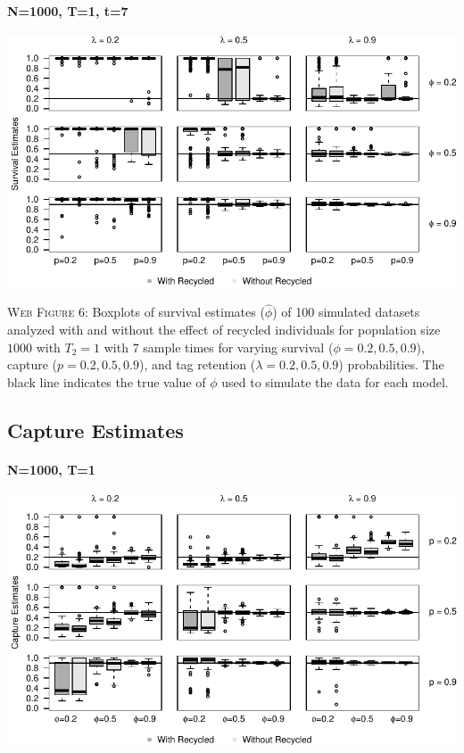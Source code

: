 \documentclass[]{article}
\let\oldparagraph\paragraph
\renewcommand{\paragraph}[1]{\oldparagraph{#1}\mbox{}}
\begin{document}
\paragraph{N=1000, T=1, t=7}\label{n1000-t1-t7}

\includegraphics{Appendix_BW_files/figure-latex/figure6_survival_GJSTL6-1.pdf}

\textsc{Web Figure 6:} Boxplots of survival estimates (\(\hat{\phi}\))
of 100 simulated datasets analyzed with and without the effect of
recycled individuals for population size \(1000\) with \(T_2=1\) with 7
sample times for varying survival (\(\phi=0.2,0.5,0.9\)), capture
(\(p=0.2,0.5,0.9\)), and tag retention (\(\lambda=0.2,0.5,0.9\))
probabilities. The black line indicates the true value of \(\phi\) used
to simulate the data for each model.

\newpage

\subsection{Capture Estimates}\label{capture-estimates}

\paragraph{N=1000, T=1}\label{n1000-t1-1}

\includegraphics{Appendix_BW_files/figure-latex/figure7_capture_GJSTL1-1.pdf}
\end{document}

